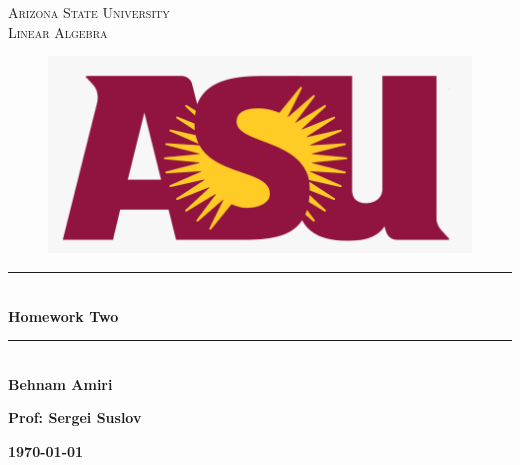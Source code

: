 \documentclass[fleqn]{article}
\begin{document}
  \begin{titlepage}

    \newcommand{\HRule}{\rule{\linewidth}{0.5mm}}

    \center


    \textsc{\LARGE Arizona State University}\\[1.5cm]

    \textsc{\LARGE Linear Algebra }\\[1.5cm]


    \begin{figure}
      \includegraphics[width=\linewidth]{asu.png}
    \end{figure}


    \HRule \\[0.4cm]
    { \huge \bfseries Homework Two}\\[0.4cm] 
    \HRule \\[1.5cm]

    \textbf{Behnam Amiri}

    \bigbreak

    \textbf{Prof: Sergei Suslov}

    \bigbreak


    \textbf{{\large \today}\\[2cm]}

    \vfill

  \end{titlepage}
\end{document}
